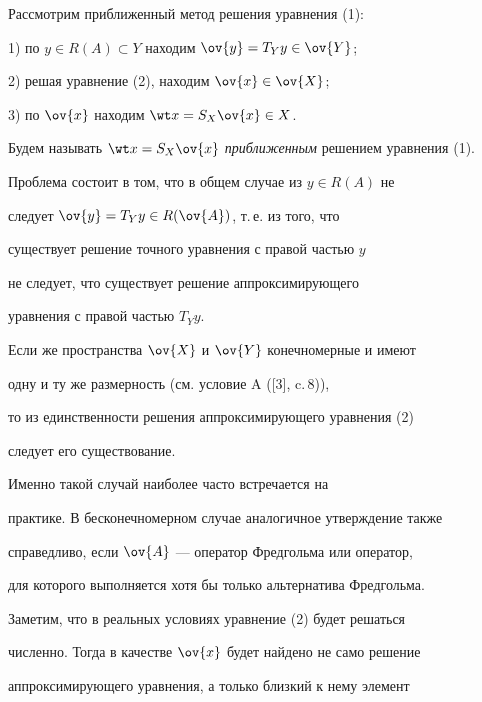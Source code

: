 Рассмотрим приближенный метод решения уравнения (1):





1) по $y\in R(A)\subset Y$ находим $\ov{y} =T_Yy\in \ov{Y}$;





2) решая уравнение (2), находим $\ov{x}\in\ov{X}$;





3) по $\ov{x}$ находим $\wt x =S_X\ov{x}\in X$.





Будем называть $\wt x=S_X\ov{x}$ {\em приближенным} решением уравнения (1).





Проблема состоит в том, что в общем случае из $y\in R(A)$ не


следует $\ov{y} =T_Yy \in R(\ov{A})$, т.\,е. из того, что


существует решение точного уравнения с правой частью $y$


не следует, что существует решение аппроксимирующего


уравнения с правой частью $T_Yy$.





Если же пространства $\ov{X}$ и $\ov{Y}$ конечномерные и имеют


одну и ту же размерность (см. условие A ([3], c.\,8)),


то из единственности решения аппроксимирующего уравнения (2)


следует его существование.


Именно такой случай наиболее часто встречается на


практике. В бесконечномерном случае аналогичное утверждение также


справедливо, если $\ov{A}$ --- оператор Фредгольма или оператор,


для которого выполняется хотя бы только альтернатива Фредгольма.





Заметим, что в реальных условиях уравнение (2) будет решаться


численно. Тогда в качестве $\ov{x}$ будет найдено не само решение


аппроксимирующего уравнения, а только близкий к нему элемент


